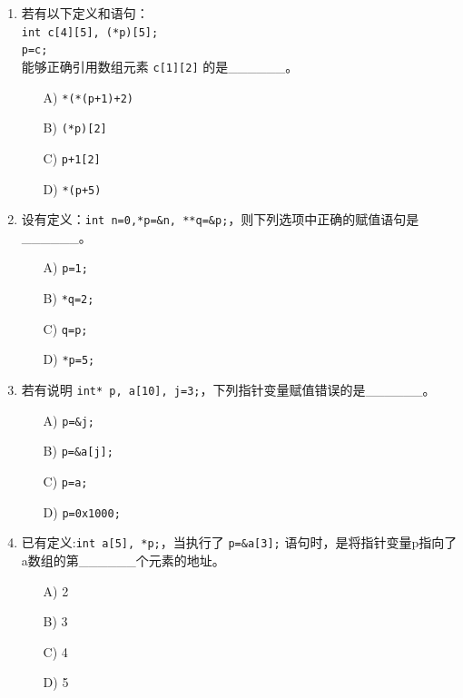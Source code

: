 \documentclass[a4paper,12pt]{article}
\begin{document}
\begin{enumerate}
	\item 若有以下定义和语句：\\
	      \texttt{int c[4][5], (*p)[5];}\\
	      \texttt{p=c;}\\
	      能够正确引用数组元素 \texttt{c[1][2]} 的是\_\_\_\_\_\_。
	      \begin{enumerate}
		      \item[A)] \texttt{*(*(p+1)+2)}
		      \item[B)] \texttt{(*p)[2]}
		      \item[C)] \texttt{p+1[2]}
		      \item[D)] \texttt{*(p+5)}
	      \end{enumerate}
	      \vspace{0.3cm}

	\item 设有定义：\texttt{int n=0,*p=\&n, **q=\&p;}，则下列选项中正确的赋值语句是\_\_\_\_\_\_。
	      \begin{enumerate}
		      \item[A)] \texttt{p=1;}
		      \item[B)] \texttt{*q=2;}
		      \item[C)] \texttt{q=p;}
		      \item[D)] \texttt{*p=5;}
	      \end{enumerate}
	      \vspace{0.3cm}

	\item 若有说明 \texttt{int* p, a[10], j=3;}，下列指针变量赋值错误的是\_\_\_\_\_\_。
	      \begin{enumerate}
		      \item[A)] \texttt{p=\&j;}
		      \item[B)] \texttt{p=\&a[j];}
		      \item[C)] \texttt{p=a;}
		      \item[D)] \texttt{p=0x1000;}
	      \end{enumerate}
	      \vspace{0.3cm}

	\item 已有定义:\texttt{int a[5], *p;}，当执行了 \texttt{p=\&a[3];} 语句时，是将指针变量p指向了a数组的第\_\_\_\_\_\_个元素的地址。
	      \begin{enumerate}
		      \item[A)] 2
		      \item[B)] 3
		      \item[C)] 4
		      \item[D)] 5
	      \end{enumerate}
	      \vspace{0.3cm}


\end{enumerate}
\end{document}
